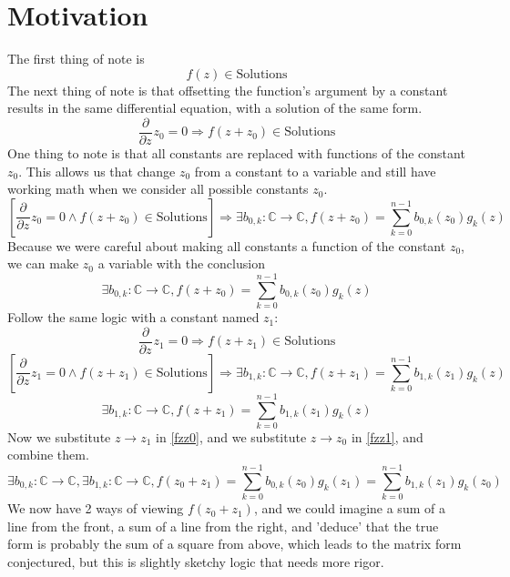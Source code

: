 \documentclass[]{article}
\newcommand{\pqty}[1]{{\left(#1\right)}}
\newcommand{\bqty}[1]{{\left[#1\right]}}
\newcommand{\pdiff}[2]{\frac{\partial^{#2}}{\partial #1^{#2}}}
\numberwithin{equation}{section}
\begin{document}
	\section{Motivation}
	The first thing of note is
	\begin{equation}
		f\pqty{z}\in\text{Solutions}
	\end{equation}
	The next thing of note is that offsetting the function's argument by a constant results in the same differential equation, with a solution of the same form.
	\begin{equation}
		\pdiff{z}{}z_0=0 \Rightarrow f\pqty{z+z_0}\in\text{Solutions}
	\end{equation}	
	One thing to note is that all constants are replaced with functions of the constant \(z_0\). This allows us that change \(z_0\) from a constant to a variable and still have working math when we consider all possible constants \(z_0\).
	\begin{equation}
		\bqty{\pdiff{z}{}z_0=0 \land f\pqty{z+z_0}\in\text{Solutions}}
		\Rightarrow \exists b_{0,k} : \mathbb{C}\to\mathbb{C}, f\pqty{z+z_0} = \sum_{k=0}^{n-1}b_{0,k}\pqty{z_0} g_k\pqty{z}
	\end{equation}
	Because we were careful about making all constants a function of the constant \(z_0\), we can make \(z_0\) a variable with the conclusion
	\begin{equation}
		\label{fzz0}
		\exists b_{0,k} : \mathbb{C}\to\mathbb{C}, f\pqty{z+z_0} = \sum_{k=0}^{n-1}b_{0,k}\pqty{z_0} g_k\pqty{z}
	\end{equation}
	Follow the same logic with a constant named \(z_1\):
	\begin{equation}
		\pdiff{z}{}z_1=0 \Rightarrow f\pqty{z+z_1}\in\text{Solutions}
	\end{equation}	
	\begin{equation}
		\bqty{\pdiff{z}{}z_1=0 \land f\pqty{z+z_1}\in\text{Solutions}}
		\Rightarrow \exists b_{1,k} : \mathbb{C}\to\mathbb{C}, f\pqty{z+z_1} = \sum_{k=0}^{n-1}b_{1,k}\pqty{z_1} g_k\pqty{z}
	\end{equation}
	\begin{equation}
		\label{fzz1}
		\exists b_{1,k} : \mathbb{C}\to\mathbb{C}, f\pqty{z+z_1} = \sum_{k=0}^{n-1}b_{1,k}\pqty{z_1} g_k\pqty{z}
	\end{equation}
	Now we substitute \(z\to z_1\) in \eqref{fzz0}, and we substitute \(z\to z_0\) in \eqref{fzz1}, and combine them.
	\begin{equation}
		\exists b_{0,k} : \mathbb{C}\to\mathbb{C},
		\exists b_{1,k} : \mathbb{C}\to\mathbb{C},
		f\pqty{z_0+z_1}
		= \sum_{k=0}^{n-1}b_{0,k}\pqty{z_0} g_k\pqty{z_1}
		= \sum_{k=0}^{n-1}b_{1,k}\pqty{z_1} g_k\pqty{z_0}
	\end{equation}
	We now have 2 ways of viewing \(f\pqty{z_0+z_1}\), and we could imagine a sum of a line from the front, a sum of a line from the right, and 'deduce' that the true form is probably the sum of a square from above, which leads to the matrix form conjectured, but this is slightly sketchy logic that needs more rigor.
\end{document}
